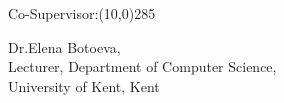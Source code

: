 \vfill
\normalsize
Co-Supervisor:\line(10,0){285}
\vspace{-0.50cm}
\begin{center}\normalsize
Dr.Elena Botoeva, \\
Lecturer, Department of Computer Science,\\
University of Kent, Kent
\end{center}


\vfill
\vfill




